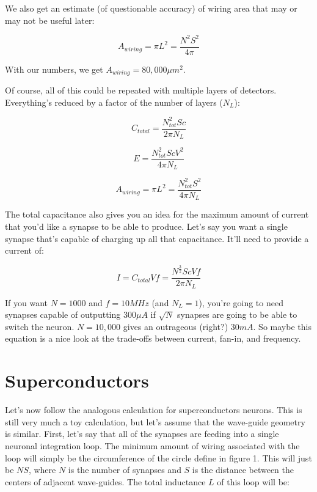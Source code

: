 \documentclass{article}
\begin{document}
We also get an estimate (of questionable accuracy) of wiring area that may or may not be useful later:

\begin{equation}
    A_{wiring} = \pi L^2 = \frac{N^2 S^2}{4\pi}
\end{equation}

With our numbers, we get $A_{wiring} = 80,000 \mu m^2$. 

Of course, all of this could be repeated with multiple layers of detectors. Everything's reduced by a factor of the number of layers ($N_L$):

\begin{equation}
    C_{total} = \frac{N_{tot}^{2}Sc}{2\pi N_L}
\end{equation}

\begin{equation}
    E = \frac{N_{tot}^{2}ScV^{2}}{4\pi N_L}
\end{equation}

\begin{equation}
    A_{wiring} = \pi L^2 = \frac{N_{tot}^2 S^2}{4\pi N_L}
\end{equation}

The total capacitance also gives you an idea for the maximum amount of current that you'd like a synapse to be able to produce. Let's say you want a single synapse that's capable of charging up all that capacitance. It'll need to provide a current of:

\begin{equation}
    I = C_{total}Vf = \frac{N^{\frac{3}{2}}ScVf}{2\pi N_L}
\end{equation}

If you want $N=1000$ and $f=10 MHz$ (and $N_L = 1$), you're going to need synapses capable of outputting $300 \mu A$ if $\sqrt{N}$ synapses are going to be able to switch the neuron. $N=10,000$ gives an outrageous (right?) $30 mA$. So maybe this equation is a nice look at the trade-offs between current, fan-in, and frequency.

\section{Superconductors}
Let's now follow the analogous calculation for superconductors neurons. This is still very much a toy calculation, but let's assume that the wave-guide geometry is similar. First, let's say that all of the synapses are feeding into a single neuronal integration loop. The minimum amount of wiring associated with the loop will simply be the circumference of the circle define in figure 1. This will just be $NS$, where $N$ is the number of synapses and $S$ is the distance between the centers of adjacent wave-guides. The total inductance $L$ of this loop will be:
\end{document}
